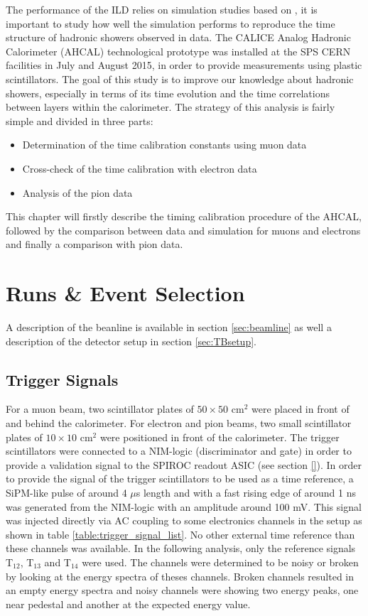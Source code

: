 The performance of the ILD relies on simulation studies based on \geant, it is important to study how well the simulation performs to reproduce the time structure of hadronic showers observed in data. The CALICE Analog Hadronic Calorimeter (AHCAL) technological prototype was installed at the SPS CERN facilities in July and August 2015, in order to provide measurements using plastic scintillators. The goal of this study is to improve our knowledge about hadronic showers, especially in terms of its time evolution and the time correlations between layers within the calorimeter. The strategy of this analysis is fairly simple and divided in three parts:
\begin{itemize}
	\item Determination of the time calibration constants using muon data
	\item Cross-check of the time calibration with electron data
	\item Analysis of the pion data
\end{itemize}
This chapter will firstly describe the timing calibration procedure of the AHCAL, followed by the comparison between data and simulation for muons and electrons and finally a comparison with pion data.

\chapter{Runs \& Event Selection}
\label{sec:EvtSelection}

A description of the beanline is available in section \ref{sec:beamline} as well a description of the detector setup in section \ref{sec:TBsetup}.

\section{Trigger Signals}
\label{subsec:trigger}

For a muon beam, two scintillator plates of $50\times50$ cm$^2$ were placed in front of and behind the calorimeter. For electron and pion beams, two small scintillator plates of $10\times10$ cm$^2$ were positioned in front of the calorimeter. The trigger scintillators were connected to a NIM-logic (discriminator and gate) in order to provide a validation signal to the SPIROC readout ASIC (see section \ref{}).
In order to provide the signal of the trigger scintillators to be used as a time reference, a SiPM-like pulse of around 4 $\mu$s length and with a fast rising edge of around 1 ns was generated from the NIM-logic with an amplitude around 100 mV. This signal was injected directly via AC coupling to some electronics channels in the setup as shown in table \ref{table:trigger_signal_list}. No other external time reference than these channels was available. In the following analysis, only the reference signals T$_{12}$,  T$_{13}$ and T$_{14}$ were used. The channels were determined to be noisy or broken by looking at the energy spectra of theses channels. Broken channels resulted in an empty energy spectra and noisy channels were showing two energy peaks, one near pedestal and another at the expected energy value.

